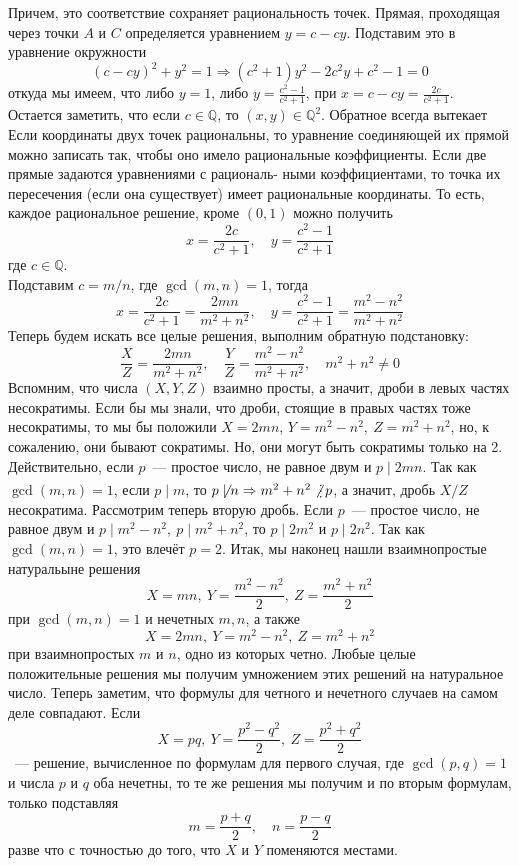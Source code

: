 \documentclass[11pt]{report}
\begin{document}
\begin{example}
        Причем, это соответствие сохраняет рациональность точек. Прямая, проходящая через точки $A$ и $C$ определяется
        уравнением $y = c - cy$. Подставим это в уравнение окружности
        \[ (c - cy)^2 + y^2 = 1 \Rightarrow  (c^2 + 1)y^2 - 2c^2 y + c^2 - 1 = 0 \]
        откуда мы имеем, что либо $y = 1$, либо $y = \frac{c^2 - 1}{c^2 + 1}$, при $x = c - cy = \frac{2c}{c^2 + 1}$.
        Остается заметить, что если $c \in \mathbb{Q}$, то $(x, y) \in \mathbb{Q}^2$. Обратное всегда вытекает Если координаты двух точек рациональны, то уравнение соединяющей их прямой можно записать так, чтобы оно имело рациональные коэффициенты.
        Если две прямые задаются уравнениями с рациональ- ными коэффициентами, то точка их пересечения (если она существует) имеет рациональные координаты.
        То есть, каждое рациональное решение, кроме $(0, 1)$ можно получить
        \[ x = \frac{2c}{c^2 + 1}, \quad y = \frac{c^2 - 1}{c^2 + 1} \]
        где $c \in \mathbb{Q}$. \\
        Подставим $c = m / n$, где $\gcd(m, n) = 1$, тогда
        \[ x = \frac{2c}{c^2 + 1} = \frac{2mn}{m^2 + n^2}, \quad y = \frac{c^2 - 1}{c^2 + 1} = \frac{m^2 - n^2}{m^2 + n^2}\]
        Теперь будем искать все целые решения, выполним обратную подстановку:
        \[ \frac{X}{Z} = \frac{2mn}{m^2 + n^2}, \quad \frac{Y}{Z} = \frac{m^2 - n^2}{m^2 + n^2}, \quad m^2 + n^2 \neq 0 \]
        Вспомним, что числа $(X, Y, Z)$ взаимно просты, а значит, дроби в левых частях несократимы. Если бы мы знали, что дроби, стоящие в правых частях тоже несократимы, то
        мы бы положили $X = 2mn$, $Y = m^2 - n^2, \ Z = m^2 + n^2$, но, к сожалению, они бывают сократимы.
        Но, они могут быть сократимы только на 2. Действительно, если $p$~--- простое число, не равное двум и $p \mid 2 mn$. Так как
        $\gcd(m, n) = 1$, если $p \mid m$, то $p \not\mid n \Rightarrow m^2 + n^2 \not\divisible p$, а значит, дробь $X / Z$ несократима.
        Рассмотрим теперь вторую дробь. Если $p$~--- простое число, не равное двум и $p \mid m^2 - n^2, \ p \mid m^2 + n^2$, то
        $p \mid 2m^2$ и $p \mid 2n^2$. Так как $\gcd(m, n) = 1$,  это влечёт $p = 2$. Итак, мы
        наконец нашли взаимнопростые натуральыне решения
        \[ X = mn, \ Y = \frac{m^2 - n^2}{2}, \ Z = \frac{m^2 + n^2}{2} \]
        при $\gcd(m, n) = 1$ и нечетных $m, n$, а также
        \[ X = 2mn, \ Y = m^2 - n^2, \ Z = m^2 + n^2 \]
        при взаимнопростых $m$ и $n$, одно из которых четно. Любые целые положительные решения мы получим умножением этих решений на натуральное число.
        Теперь заметим, что формулы для четного и нечетного случаев на самом деле совпадают.
        Если
        \[ X = pq,\  Y = \frac{p^2 - q^2}{2}, \ Z = \frac{p^2 + q^2}{2}\]
        ~--- решение, вычисленное по формулам для первого случая, где $\gcd(p, q) = 1$ и числа $p$ и $q$ оба нечетны, то те же решения
        мы получим и по вторым формулам, только подставляя
        \[ m = \frac{p + q}{2}, \quad n = \frac{p - q}{2} \]
        разве что с точностью до того, что $X$ и $Y$ поменяются местами.
    \end{example}
\end{document}
